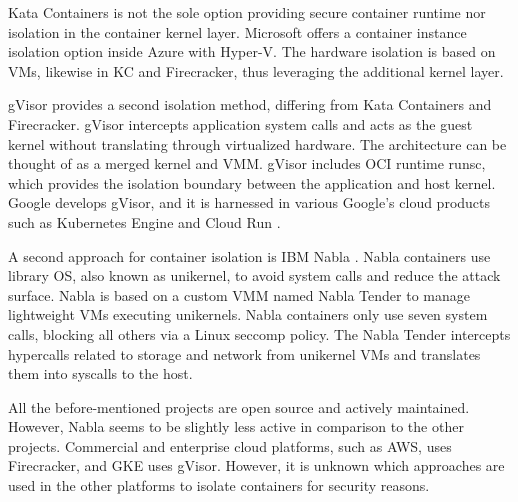 Kata Containers is not the sole option providing secure container runtime nor isolation in the container kernel layer. Microsoft offers a container instance isolation option inside Azure with Hyper-V. The hardware isolation is based on VMs, likewise in KC and Firecracker, thus leveraging the additional kernel layer. \cite{Hyper-V}

gVisor provides a second isolation method, differing from Kata Containers and Firecracker. gVisor intercepts application system calls and acts as the guest kernel without translating through virtualized hardware. The architecture can be thought of as a merged kernel and VMM. gVisor includes OCI runtime runsc, which provides the isolation boundary between the application and host kernel. Google develops gVisor, and it is harnessed in various Google's cloud products such as Kubernetes Engine \cite{GKE} and Cloud Run \cite{CloudRun}. \cite{Debab2021}\cite{gVisor}

A second approach for container isolation is IBM Nabla \cite{Nabla}. Nabla containers use library OS, also known as unikernel, to avoid system calls and reduce the attack surface. Nabla is based on a custom VMM named Nabla Tender to manage lightweight VMs executing unikernels. Nabla containers only use seven system calls, blocking all others via a Linux seccomp policy. The Nabla Tender intercepts hypercalls related to storage and network from unikernel VMs and translates them into syscalls to the host. \cite{Debab2021}

All the before-mentioned projects are open source and actively maintained. However, Nabla seems to be slightly less active in comparison to the other projects. Commercial and enterprise cloud platforms, such as AWS, uses Firecracker, and GKE uses gVisor. However, it is unknown which approaches are used in the other platforms to isolate containers for security reasons.








